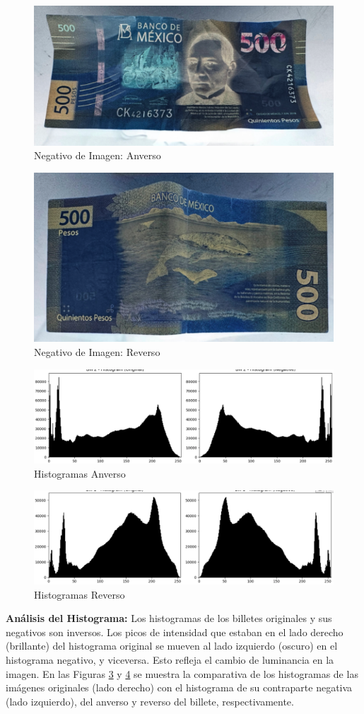 \documentclass[12pt,letterpaper]{article}
\begin{document}
\begin{figure}[H]
  \centering
  \includegraphics[width=0.5\linewidth]{figuras/negativo1.png}
  \caption{Negativo de Imagen: Anverso}
  \label{fig:billete_negativo_1}
\end{figure}

\begin{figure}[H]
  \centering
  \includegraphics[width=0.5\linewidth]{figuras/negativo2.png}
  \caption{Negativo de Imagen: Reverso}
  \label{fig:billete_negativo_2}
\end{figure}

\begin{figure}[H]
  \centering
  \includegraphics[width=0.5\linewidth]{figuras/histograma_negativo1.png}
  \caption{Histogramas Anverso}
  \label{fig:histograma_negativo1}
\end{figure}

\begin{figure}[H]
  \centering
  \includegraphics[width=0.5\linewidth]{figuras/histograma_negativo2.png}
  \caption{Histogramas Reverso}
  \label{fig:histograma_negativo2}
\end{figure}


\textbf{Análisis del Histograma:} Los histogramas de los billetes originales y sus negativos son inversos. Los picos de intensidad que estaban en el lado derecho (brillante) del histograma original se mueven al lado izquierdo (oscuro) en el histograma negativo, y viceversa. Esto refleja el cambio de luminancia en la imagen. En las Figuras \ref{fig:histograma_negativo1} y \ref{fig:histograma_negativo2} se muestra la comparativa de los histogramas de las imágenes originales (lado derecho) con el histograma de su contraparte negativa (lado izquierdo), del anverso y reverso del billete, respectivamente.
\end{document}
